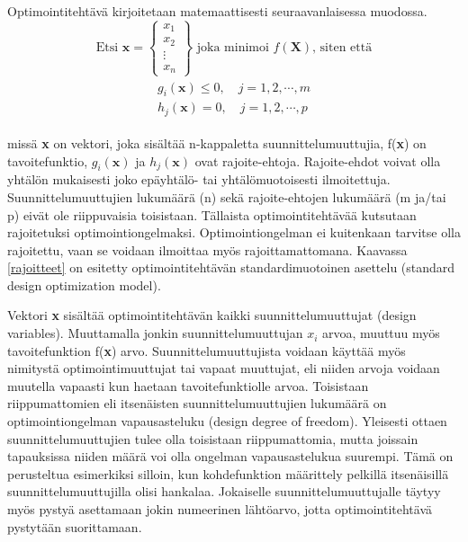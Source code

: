 \documentclass[12pt]{article}
\newenvironment{content}{\pagenumbering{arabic}}{}
\begin{document}
\begin{content}
Optimointitehtävä kirjoitetaan matemaattisesti seuraavanlaisessa muodossa.
\begin{equation*}
\text{Etsi } \textbf{x} = 
\begin{Bmatrix} 
x_1 \\ 
x_2 \\ 
\vdots \\
x_n  
\end{Bmatrix}
\text{    joka minimoi } f(\textbf{X}) \text{, siten että}
\end{equation*}
\begin{align}
\label{rajoitteet}
\begin{split}
g_i(\textbf{x}) \leq 0, \quad j = 1,2, \cdots , m  \\ 
h_j(\textbf{x}) = 0, \quad j = 1,2, \cdots , p
\end{split}
\end{align}

missä \textbf{x} on vektori, joka sisältää n-kappaletta suunnittelumuuttujia, f(\textbf{x}) on tavoitefunktio, $g_i(\textbf{x})$ ja $h_j(\textbf{x})$ ovat rajoite-ehtoja. Rajoite-ehdot voivat olla yhtälön mukaisesti joko epäyhtälö- tai yhtälömuotoisesti ilmoitettuja. Suunnittelumuuttujien lukumäärä (n) sekä rajoite-ehtojen lukumäärä (m ja/tai p) eivät ole riippuvaisia toisistaan. Tällaista optimointitehtävää kutsutaan rajoitetuksi optimointiongelmaksi. Optimointiongelman ei kuitenkaan tarvitse olla rajoitettu, vaan se voidaan ilmoittaa myös rajoittamattomana. Kaavassa \eqref{rajoitteet} on esitetty optimointitehtävän standardimuotoinen asettelu (standard design optimization model). \parencite[6]{engopt}

Vektori \textbf{x} sisältää optimointitehtävän kaikki suunnittelumuuttujat (design variables). Muuttamalla jonkin suunnittelumuuttujan $x_i$ arvoa, muuttuu myös tavoitefunktion f(\textbf{x}) arvo. Suunnittelumuuttujista voidaan käyttää myös nimitystä optimointimuuttujat tai vapaat muuttujat, eli niiden arvoja voidaan muutella vapaasti kun haetaan tavoitefunktiolle arvoa. Toisistaan riippumattomien eli itsenäisten suunnittelumuuttujien lukumäärä on optimointiongelman vapausasteluku (design degree of freedom). Yleisesti ottaen suunnittelumuuttujien tulee olla toisistaan riippumattomia, mutta joissain tapauksissa niiden määrä voi olla ongelman vapausastelukua suurempi. Tämä on perusteltua esimerkiksi silloin, kun kohdefunktion määrittely pelkillä itsenäisillä suunnittelumuuttujilla olisi hankalaa. Jokaiselle suunnittelumuuttujalle täytyy myös pystyä asettamaan jokin numeerinen lähtöarvo, jotta optimointitehtävä pystytään suorittamaan. 


\end{content}
\end{document}
